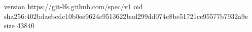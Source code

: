 version https://git-lfs.github.com/spec/v1
oid sha256:402bdaebcdc10b0ee9624e9513622bad299dd074c8be51721ce95577b7932a9e
size 43840
